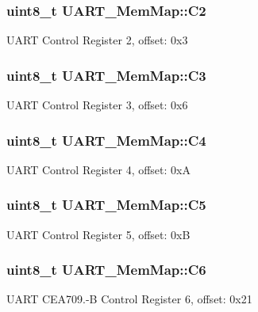 \subsubsection[{C2}]{\setlength{\rightskip}{0pt plus 5cm}uint8\+\_\+t U\+A\+R\+T\+\_\+\+Mem\+Map\+::\+C2}\label{struct_u_a_r_t___mem_map_a3e49aeb27f3613fd01a17a3c76e785b7}
U\+A\+R\+T Control Register 2, offset\+: 0x3 \hypertarget{struct_u_a_r_t___mem_map_a2e3cebfbfb9d96766397a8a102b8c29c}{}
\subsubsection[{C3}]{\setlength{\rightskip}{0pt plus 5cm}uint8\+\_\+t U\+A\+R\+T\+\_\+\+Mem\+Map\+::\+C3}\label{struct_u_a_r_t___mem_map_a2e3cebfbfb9d96766397a8a102b8c29c}
U\+A\+R\+T Control Register 3, offset\+: 0x6 \hypertarget{struct_u_a_r_t___mem_map_a6f18d698404d3f130cab66610aa526de}{}
\subsubsection[{C4}]{\setlength{\rightskip}{0pt plus 5cm}uint8\+\_\+t U\+A\+R\+T\+\_\+\+Mem\+Map\+::\+C4}\label{struct_u_a_r_t___mem_map_a6f18d698404d3f130cab66610aa526de}
U\+A\+R\+T Control Register 4, offset\+: 0x\+A \hypertarget{struct_u_a_r_t___mem_map_a1d9838b1b1a99857168954f51bc0802e}{}
\subsubsection[{C5}]{\setlength{\rightskip}{0pt plus 5cm}uint8\+\_\+t U\+A\+R\+T\+\_\+\+Mem\+Map\+::\+C5}\label{struct_u_a_r_t___mem_map_a1d9838b1b1a99857168954f51bc0802e}
U\+A\+R\+T Control Register 5, offset\+: 0x\+B \hypertarget{struct_u_a_r_t___mem_map_ac23c9991a1c144df8b3029e46e1a0c99}{}
\subsubsection[{C6}]{\setlength{\rightskip}{0pt plus 5cm}uint8\+\_\+t U\+A\+R\+T\+\_\+\+Mem\+Map\+::\+C6}\label{struct_u_a_r_t___mem_map_ac23c9991a1c144df8b3029e46e1a0c99}
U\+A\+R\+T C\+E\+A709.-\/\+B Control Register 6, offset\+: 0x21 \hypertarget{struct_u_a_r_t___mem_map_a8c98b0dd2335e137c509ba63636f5089}{}
